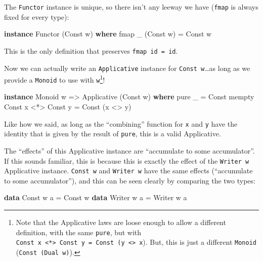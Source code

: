 \documentclass[]{article}
\newenvironment{Shaded}{}{}
\newcommand{\DataTypeTok}[1]{\textcolor[rgb]{0.56,0.13,0.00}{#1}}
\newcommand{\FunctionTok}[1]{\textcolor[rgb]{0.02,0.16,0.49}{#1}}
\newcommand{\KeywordTok}[1]{\textcolor[rgb]{0.00,0.44,0.13}{\textbf{#1}}}
\newcommand{\NormalTok}[1]{#1}
\newcommand{\OtherTok}[1]{\textcolor[rgb]{0.00,0.44,0.13}{#1}}
\begin{document}
The \texttt{Functor} instance is unique, so there isn't any leeway we have
(\texttt{fmap} is always fixed for every type):

\begin{Shaded}
\begin{Highlighting}[]
\KeywordTok{instance} \DataTypeTok{Functor}\NormalTok{ (}\DataTypeTok{Const}\NormalTok{ w) }\KeywordTok{where}
\NormalTok{    fmap _ (}\DataTypeTok{Const}\NormalTok{ w) }\FunctionTok{=} \DataTypeTok{Const}\NormalTok{ w}
\end{Highlighting}
\end{Shaded}

This is the only definition that preserves \texttt{fmap\ id\ =\ id}.

Now we can actually write an \texttt{Applicative} instance for
\texttt{Const\ w}\ldots{}as long as we provide a \texttt{Monoid} to use with
\texttt{w}\footnote{Note that the Applicative laws are loose enough to allow a
  different definition, with the same \texttt{pure}, but with
  \texttt{Const\ x\ \textless{}*\textgreater{}\ Const\ y\ =\ Const\ (y\ \textless{}\textgreater{}\ x}).
  But, this is just a different \texttt{Monoid} (\texttt{Const\ (Dual\ w)}).}!

\begin{Shaded}
\begin{Highlighting}[]
\KeywordTok{instance} \DataTypeTok{Monoid}\NormalTok{ w }\OtherTok{=>} \DataTypeTok{Applicative}\NormalTok{ (}\DataTypeTok{Const}\NormalTok{ w) }\KeywordTok{where}
\NormalTok{    pure _              }\FunctionTok{=} \DataTypeTok{Const}\NormalTok{ mempty}
    \DataTypeTok{Const}\NormalTok{ x }\FunctionTok{<*>} \DataTypeTok{Const}\NormalTok{ y }\FunctionTok{=} \DataTypeTok{Const}\NormalTok{ (x }\FunctionTok{<>}\NormalTok{ y)}
\end{Highlighting}
\end{Shaded}

Like how we said, as long as the ``combining'' function for \texttt{x} and
\texttt{y} have the identity that is given by the result of \texttt{pure}, this
is a valid Applicative.

The ``effects'' of this Applicative instance are ``accumulate to some
accumulator''. If this sounds familiar, this is because this is exactly the
effect of the \texttt{Writer\ w} Applicative instance. \texttt{Const\ w} and
\texttt{Writer\ w} have the same effects (``accumulate to some accumulator''),
and this can be seen clearly by comparing the two types:

\begin{Shaded}
\begin{Highlighting}[]
\KeywordTok{data} \DataTypeTok{Const}\NormalTok{  w a }\FunctionTok{=} \DataTypeTok{Const}\NormalTok{  w}
\KeywordTok{data} \DataTypeTok{Writer}\NormalTok{ w a }\FunctionTok{=} \DataTypeTok{Writer}\NormalTok{ w a}
\end{Highlighting}
\end{Shaded}
\end{document}
